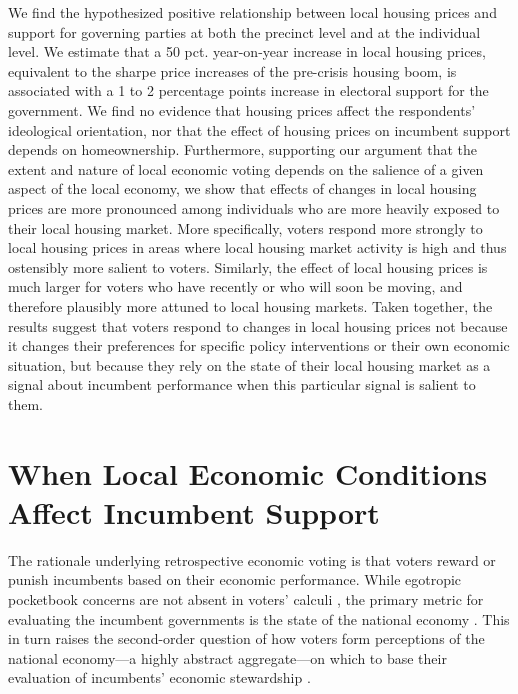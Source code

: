 \documentclass[12pt,a4paper]{article}
\begin{document}
	We find the hypothesized positive relationship between local housing prices and support for governing parties at both the precinct level and at the individual level. We estimate that a 50 pct. year-on-year increase in local housing prices, equivalent to the sharpe price increases of the pre-crisis housing boom, is associated with a 1 to 2 percentage points increase in electoral support for the government. We find no evidence that housing prices affect the respondents’ ideological orientation, nor that the effect of housing prices on incumbent support depends on homeownership. Furthermore, supporting our argument that the extent and nature of local economic voting depends on the salience of a given aspect of the local economy, we show that effects of changes in local housing prices are more pronounced among individuals who are more heavily exposed to their local housing market. More specifically, voters respond more strongly to local housing prices in areas where local housing market activity is high and thus ostensibly more salient to voters. Similarly, the effect of local housing prices is much larger for voters who have recently or who will soon be moving, and therefore plausibly more attuned to local housing markets. Taken together, the results suggest that voters respond to changes in local housing prices not because it changes their preferences for specific policy interventions or their own economic situation, but because they rely on the state of their local housing market as a signal about incumbent performance when this particular signal is salient to them.
	
	\section{When Local Economic Conditions Affect Incumbent Support}
	The rationale underlying retrospective economic voting is that voters reward or punish incumbents based on their economic performance. While egotropic pocketbook concerns are not absent in voters’ calculi \citep{healy2017digging, tilley2017pound}, the primary metric for evaluating the incumbent governments is the state of the national economy \citep{kinder1979economic,lewis2013vp}. This in turn raises the second-order question of how voters form perceptions of the national economy—a highly abstract aggregate—on which to base their evaluation of incumbents’ economic stewardship \citep{reeves2012ecologies}. 
	
\end{document}
